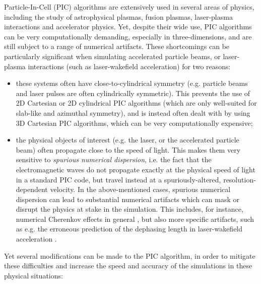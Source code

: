 \documentclass[1p,times]{elsarticle}
\begin{document}
Particle-In-Cell (PIC) algorithms \cite{Birdsall2004,Hockney1988} 
are extensively used in several areas of physics, including the study
of astrophysical plasmas, fusion plasmas, laser-plasma
interactions and accelerator physics. Yet,
despite their wide use, PIC algorithms can be very computationally
demanding, especially in three-dimensions, and are still subject to a range of numerical artifacts. 
These shortcomings can be particularly significant when simulating 
accelerated particle beams, or 
laser-plasma interactions (such as laser-wakefield acceleration) for two reasons:
\begin{itemize}
\item 
these systems often have close-to-cylindrical
  symmetry (e.g. particle beams and laser pulses are often
  cylindrically symmetric). This prevents the use of 2D Cartesian 
or 2D cylindrical PIC algorithms (which are only well-suited for slab-like and azimuthal symmetry),
and is instead often dealt with by using
  3D Cartesian PIC algorithms, which can be very 
computationally expensive; 
\item the physical objects of interest (e.g. the laser, or the
  accelerated particle beam) often propagate close to the speed of
  light. This makes them very sensitive to \emph{spurious numerical
    dispersion}, i.e. the fact that the electromagnetic waves do not
  propagate exactly at the physical speed of light in a standard PIC
  code, but travel instead at a spuriously-altered,
  resolution-dependent velocity. In the above-mentioned cases, 
spurious numerical dispersion can lead to substantial numerical artifacts
which can mask or disrupt the physics at stake in the simulation. This
includes, for instance, numerical Cherenkov effects in general
\cite{GodfreyJCP1974}, but also more specific artifacts, such as
e.g. the erroneous prediction of the dephasing length in
laser-wakefield acceleration \cite{CowanPRSTAB2013}.

\end{itemize}
Yet several modifications can be made to the PIC algorithm, in order
to mitigate these difficulties and increase the speed and
accuracy of the simulations in these physical situations: 
\end{document}
